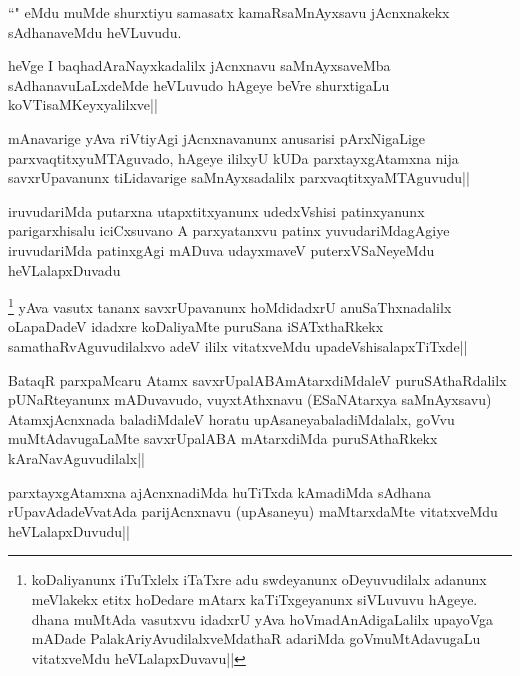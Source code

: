 \begin{artha}
``\stext " eMdu muMde shurxtiyu samasatx kamaRsaMnAyxsavu jAcnxnakekx sAdhanaveMdu heVLuvudu. 
\end{artha}

\begin{artha}%
heVge I baqhadAraNayxkadalilx jAcnxnavu saMnAyxsaveMba sAdhanavuLaLxdeMde heVLuvudo hAgeye beVre shurxtigaLu koVTisaMKeyxyalilxve||
\end{artha}

\begin{artha}
mAnavarige yAva riVtiyAgi jAcnxnavanunx anusarisi pArxNigaLige parxvaqtitxyuMTAguvado, hAgeye ililxyU kUDa parxtayxgAtamxna nija savxrUpavanunx tiLidavarige saMnAyxsadalilx parxvaqtitxyaMTAguvudu||
\end{artha}


\begin{artha}
iruvudariMda putarxna utapxtitxyanunx udedxVshisi patinxyanunx parigarxhisalu iciCxsuvano A parxyatanxvu patinx yuvudariMdagAgiye  iruvudariMda patinxgAgi mADuva udayxmaveV puterxVSaNeyeMdu heVLalapxDuvadu 
\end{artha}

\begin{artha}
\footnote[1]{koDaliyanunx iTuTxlelx iTaTxre adu swdeyanunx oDeyuvudilalx adanunx meVlakekx etitx hoDedare mAtarx kaTiTxgeyanunx siVLuvuvu hAgeye. dhana muMtAda vasutxvu idadxrU yAva hoVmadAnAdigaLalilx upayoVga mADade PalakAriyAvudilalxveMdathaR adariMda goVmuMtAdavugaLu vitatxveMdu heVLalapxDuvavu||} yAva vasutx tananx savxrUpavanunx hoMdidadxrU anuSaThxnadalilx oLapaDadeV idadxre koDaliyaMte puruSana iSATxthaRkekx samathaRvAguvudilalxvo adeV ililx vitatxveMdu upadeVshisalapxTiTxde||
\end{artha}


\begin{artha}
BataqR parxpaMcaru Atamx savxrUpalABAmAtarxdiMdaleV puruSAthaRdalilx pUNaRteyanunx mADuvavudo, vuyxtAthxnavu (ESaNAtarxya saMnAyxsavu) AtamxjAcnxnada baladiMdaleV horatu upAsaneyabaladiMdalalx, goVvu muMtAdavugaLaMte savxrUpalABA mAtarxdiMda puruSAthaRkekx kAraNavAguvudilalx|| 
\end{artha}%

\begin{artha}
parxtayxgAtamxna ajAcnxnadiMda huTiTxda kAmadiMda sAdhana rUpavAdadeVvatAda parijAcnxnavu (upAsaneyu) maMtarxdaMte vitatxveMdu heVLalapxDuvudu||
\end{artha}

